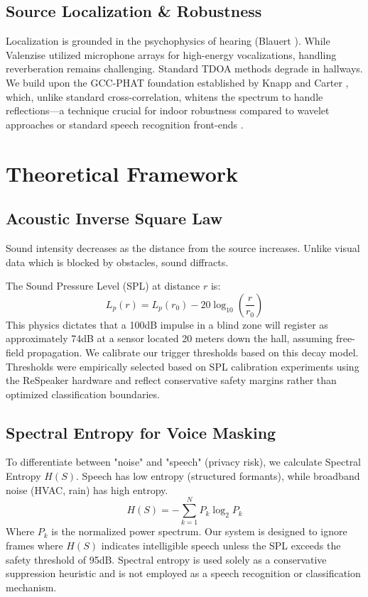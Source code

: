 \documentclass[conference]{IEEEtran}
\begin{document}
\subsection{Source Localization \& Robustness}
Localization is grounded in the psychophysics of hearing (Blauert \cite{b9}). While Valenzise \cite{b5} utilized microphone arrays for high-energy vocalizations, handling reverberation remains challenging. Standard TDOA methods degrade in hallways. We build upon the GCC-PHAT foundation established by Knapp and Carter \cite{b20}, which, unlike standard cross-correlation, whitens the spectrum to handle reflections—a technique crucial for indoor robustness compared to wavelet approaches \cite{b10} or standard speech recognition front-ends \cite{b11}.

\section{Theoretical Framework}

\subsection{Acoustic Inverse Square Law}
Sound intensity decreases as the distance from the source increases. Unlike visual data which is blocked by obstacles, sound diffracts.

The Sound Pressure Level (SPL) at distance $r$ is:
\begin{equation}
L_p(r) = L_p(r_0) - 20 \log_{10}\left(\frac{r}{r_0}\right)
\end{equation}
This physics dictates that a 100dB impulse in a blind zone will register as approximately 74dB at a sensor located 20 meters down the hall, assuming free-field propagation. We calibrate our trigger thresholds based on this decay model. Thresholds were empirically selected based on SPL calibration experiments using the ReSpeaker hardware and reflect conservative safety margins rather than optimized classification boundaries.

\subsection{Spectral Entropy for Voice Masking}
To differentiate between "noise" and "speech" (privacy risk), we calculate Spectral Entropy $H(S)$. Speech has low entropy (structured formants), while broadband noise (HVAC, rain) has high entropy.
\begin{equation}
H(S) = -\sum_{k=1}^{N} P_k \log_2 P_k
\end{equation}
Where $P_k$ is the normalized power spectrum. Our system is designed to ignore frames where $H(S)$ indicates intelligible speech unless the SPL exceeds the safety threshold of 95dB. Spectral entropy is used solely as a conservative suppression heuristic and is not employed as a speech recognition or classification mechanism.
\end{document}
